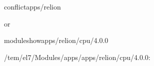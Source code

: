 \documentclass[a4paper,10pt,english]{sphinxmanual}
\begin{document}
\begin{sphinxVerbatim}[commandchars=\\\{\}]
conflictapps/relion
\PYGZhy{}\PYGZhy{}\PYGZhy{}\PYGZhy{}\PYGZhy{}\PYGZhy{}\PYGZhy{}\PYGZhy{}\PYGZhy{}\PYGZhy{}\PYGZhy{}\PYGZhy{}\PYGZhy{}\PYGZhy{}\PYGZhy{}\PYGZhy{}\PYGZhy{}\PYGZhy{}\PYGZhy{}\PYGZhy{}\PYGZhy{}\PYGZhy{}\PYGZhy{}\PYGZhy{}\PYGZhy{}\PYGZhy{}\PYGZhy{}\PYGZhy{}\PYGZhy{}\PYGZhy{}\PYGZhy{}\PYGZhy{}\PYGZhy{}\PYGZhy{}\PYGZhy{}\PYGZhy{}\PYGZhy{}\PYGZhy{}\PYGZhy{}\PYGZhy{}\PYGZhy{}\PYGZhy{}\PYGZhy{}\PYGZhy{}\PYGZhy{}\PYGZhy{}\PYGZhy{}\PYGZhy{}\PYGZhy{}\PYGZhy{}\PYGZhy{}\PYGZhy{}\PYGZhy{}\PYGZhy{}\PYGZhy{}\PYGZhy{}\PYGZhy{}\PYGZhy{}\PYGZhy{}\PYGZhy{}\PYGZhy{}\PYGZhy{}\PYGZhy{}\PYGZhy{}\PYGZhy{}\PYGZhy{}\PYGZhy{}

or

\PYGZdl{}\PYGZgt{}moduleshowapps/relion/cpu/4.0.0

\PYGZhy{}\PYGZhy{}\PYGZhy{}\PYGZhy{}\PYGZhy{}\PYGZhy{}\PYGZhy{}\PYGZhy{}\PYGZhy{}\PYGZhy{}\PYGZhy{}\PYGZhy{}\PYGZhy{}\PYGZhy{}\PYGZhy{}\PYGZhy{}\PYGZhy{}\PYGZhy{}\PYGZhy{}\PYGZhy{}\PYGZhy{}\PYGZhy{}\PYGZhy{}\PYGZhy{}\PYGZhy{}\PYGZhy{}\PYGZhy{}\PYGZhy{}\PYGZhy{}\PYGZhy{}\PYGZhy{}\PYGZhy{}\PYGZhy{}\PYGZhy{}\PYGZhy{}\PYGZhy{}\PYGZhy{}\PYGZhy{}\PYGZhy{}\PYGZhy{}\PYGZhy{}\PYGZhy{}\PYGZhy{}\PYGZhy{}\PYGZhy{}\PYGZhy{}\PYGZhy{}\PYGZhy{}\PYGZhy{}\PYGZhy{}\PYGZhy{}\PYGZhy{}\PYGZhy{}\PYGZhy{}\PYGZhy{}\PYGZhy{}\PYGZhy{}\PYGZhy{}\PYGZhy{}\PYGZhy{}\PYGZhy{}\PYGZhy{}\PYGZhy{}\PYGZhy{}\PYGZhy{}\PYGZhy{}\PYGZhy{}
/tem/el7/Modules/apps/apps/relion/cpu/4.0.0:


\end{sphinxVerbatim}
\end{document}
